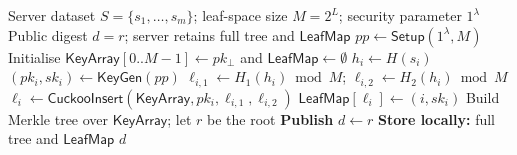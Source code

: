 \documentclass[preprint,12pt]{elsarticle}
\newcommand{\keygen}{\textsf{KeyGen}}
\newcommand{\LeafMap}{\mathsf{LeafMap}}
\newcommand{\KeyArray}{\mathsf{KeyArray}}
\newcommand{\NullPK}{pk_{\bot}}
\begin{document}
\begin{algorithm}[H]
\caption{Laconic PSI: Offline Phase (Server)}
\label{alg:offline}
\begin{algorithmic}[1]
\REQUIRE Server dataset $S = \{s_1, \ldots, s_m\}$; leaf-space size $M=2^L$;
         security parameter $1^\lambda$
\ENSURE Public digest $d = r$; server retains full tree and $\LeafMap$
\STATE $\mathit{pp} \leftarrow \mathsf{Setup}(1^\lambda, M)$
\STATE Initialise $\KeyArray[0..M-1] \leftarrow \NullPK$ and $\LeafMap \leftarrow \emptyset$
  \STATE $h_i \leftarrow H(s_i)$ 
  \STATE $(pk_i, sk_i) \leftarrow \keygen(\mathit{pp})$
  \STATE $\ell_{i,1} \leftarrow H_1(h_i) \bmod M$;
         $\ell_{i,2} \leftarrow H_2(h_i) \bmod M$
  \STATE $\ell_i \leftarrow \mathsf{CuckooInsert}(\KeyArray, pk_i,
         \ell_{i,1}, \ell_{i,2})$
  \STATE $\LeafMap[\ell_i] \leftarrow (i, sk_i)$
\ENDFOR
\STATE Build Merkle tree over $\KeyArray$; let $r$ be the root
\STATE \textbf{Publish} $d \leftarrow r$
\STATE \textbf{Store locally:} full tree and $\LeafMap$
\RETURN $d$
\end{algorithmic}
\end{algorithm}
\end{document}
